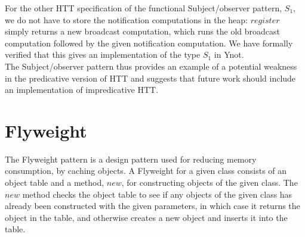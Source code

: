 \documentclass[a4paper,english]{article}
\begin{document}
For the other HTT specification of the functional Subject/observer pattern,
$S_1$, we do not have to store the notification computations in the heap:
$register$ simply returns a new broadcast computation, which runs the old
broadcast computation followed by the given notification computation. We have
formally verified that this gives an implementation of the type $S_1$ in Ynot.\\

The Subject/observer pattern thus provides an example of a potential weakness
in the predicative version of HTT and suggests that future work should include
an implementation of impredicative HTT. 

\section{Flyweight}

The Flyweight pattern is a design pattern used for reducing memory consumption,
by caching objects. A Flyweight for a given class consists of an object table
and a method, $new$, for constructing objects of the given class. The $new$
method checks the object table to see if any objects of the given class has
already been constructed with the given parameters, in which case it returns
the object in the table, and otherwise creates a new object and inserts it into
the table. 
\end{document}
